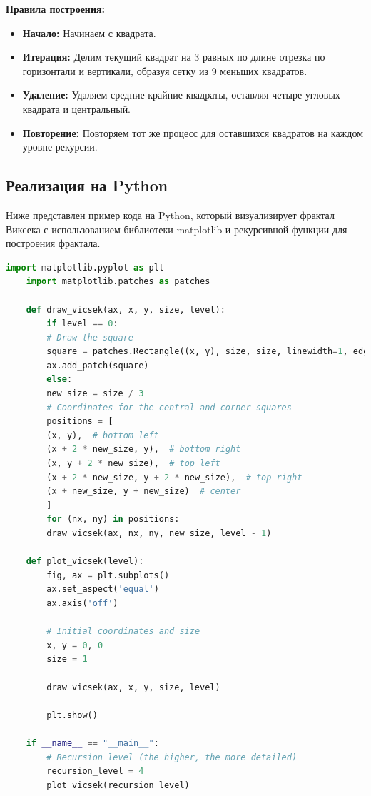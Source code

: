 \documentclass{article}
\begin{document}
	\textbf{Правила построения:}
	
	\begin{itemize}
		\item \textbf{Начало:} Начинаем с квадрата.
		\item \textbf{Итерация:} Делим текущий квадрат на 3 равных по длине отрезка по горизонтали и вертикали, образуя сетку из 9 меньших квадратов.
		\item \textbf{Удаление:} Удаляем средние крайние квадраты, оставляя четыре угловых квадрата и центральный.
		\item \textbf{Повторение:} Повторяем тот же процесс для оставшихся квадратов на каждом уровне рекурсии.
	\end{itemize}
	
	\subsection{Реализация на Python}
	Ниже представлен пример кода на Python, который визуализирует фрактал Виксека с использованием библиотеки matplotlib и рекурсивной функции для построения фрактала.
	
\begin{lstlisting}[language=Python, inputencoding=utf8]
	import matplotlib.pyplot as plt
	import matplotlib.patches as patches
	
	def draw_vicsek(ax, x, y, size, level):
		if level == 0:
		# Draw the square
		square = patches.Rectangle((x, y), size, size, linewidth=1, edgecolor='black', 	facecolor='black')
		ax.add_patch(square)
		else:
		new_size = size / 3
		# Coordinates for the central and corner squares
		positions = [
		(x, y),  # bottom left
		(x + 2 * new_size, y),  # bottom right
		(x, y + 2 * new_size),  # top left
		(x + 2 * new_size, y + 2 * new_size),  # top right
		(x + new_size, y + new_size)  # center
		]
		for (nx, ny) in positions:
		draw_vicsek(ax, nx, ny, new_size, level - 1)
	
	def plot_vicsek(level):
		fig, ax = plt.subplots()
		ax.set_aspect('equal')
		ax.axis('off')
		
		# Initial coordinates and size
		x, y = 0, 0
		size = 1
	
		draw_vicsek(ax, x, y, size, level)
	
		plt.show()
	
	if __name__ == "__main__":
		# Recursion level (the higher, the more detailed)
		recursion_level = 4
		plot_vicsek(recursion_level)
	
\end{lstlisting}
	
\end{document}
